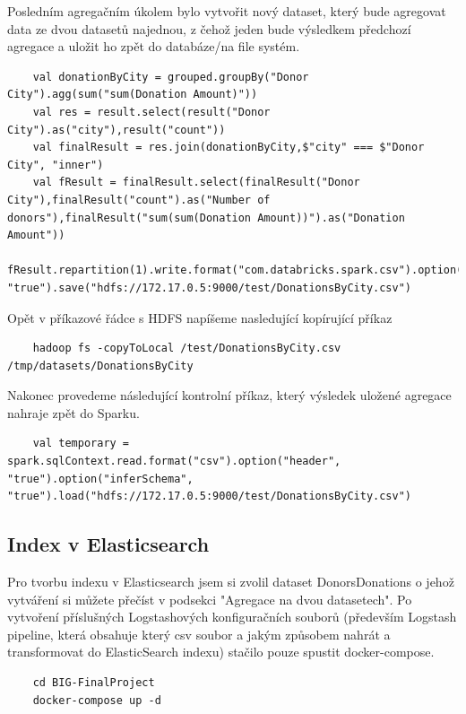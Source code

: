 \documentclass[12pt,a4paper]{article}
\begin{document}
Posledním agregačním úkolem bylo vytvořit nový dataset, který bude agregovat data ze dvou datasetů najednou, z čehož jeden bude výsledkem předchozí agregace a uložit ho zpět do databáze/na file systém.
\begin{lstlisting}
    val donationByCity = grouped.groupBy("Donor City").agg(sum("sum(Donation Amount)"))
    val res = result.select(result("Donor City").as("city"),result("count"))
    val finalResult = res.join(donationByCity,$"city" === $"Donor City", "inner")
    val fResult = finalResult.select(finalResult("Donor City"),finalResult("count").as("Number of donors"),finalResult("sum(sum(Donation Amount))").as("Donation Amount"))
    fResult.repartition(1).write.format("com.databricks.spark.csv").option("header", "true").save("hdfs://172.17.0.5:9000/test/DonationsByCity.csv")
\end{lstlisting}

Opět v příkazové řádce s HDFS napíšeme nasledující kopírující příkaz
\begin{lstlisting}
    hadoop fs -copyToLocal /test/DonationsByCity.csv /tmp/datasets/DonationsByCity
\end{lstlisting}

Nakonec provedeme následující kontrolní příkaz, který výsledek uložené agregace nahraje zpět do Sparku.
\begin{lstlisting}
    val temporary = spark.sqlContext.read.format("csv").option("header", "true").option("inferSchema", "true").load("hdfs://172.17.0.5:9000/test/DonationsByCity.csv")
\end{lstlisting}
\pagebreak

\subsection{Index v Elasticsearch}
Pro tvorbu indexu v Elasticsearch jsem si zvolil dataset DonorsDonations o jehož vytváření si můžete přečíst v podsekci "Agregace na dvou datasetech". Po vytvoření příslušných Logstashových konfiguračních souborů (především Logstash pipeline, která obsahuje který csv soubor a jakým způsobem nahrát a transformovat do ElasticSearch indexu) stačilo pouze spustit docker-compose.
\begin{lstlisting}
    cd BIG-FinalProject
    docker-compose up -d
\end{lstlisting}
\end{document}
